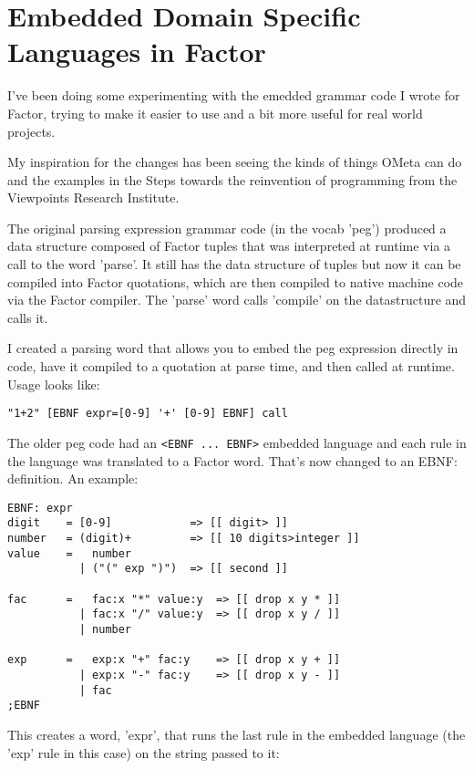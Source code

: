 \chapter{Embedded Domain Specific Languages in Factor}\label{pegsebnf}

I've been doing some experimenting with the emedded grammar code I
wrote for Factor, trying to make it easier to use and a bit more
useful for real world projects.

My inspiration for the changes has been seeing the kinds of things
OMeta can do and the examples in the Steps towards the reinvention of
programming from the Viewpoints Research Institute.

The original parsing expression grammar code (in the vocab 'peg')
produced a data structure composed of Factor tuples that was
interpreted at runtime via a call to the word 'parse'. It still has
the data structure of tuples but now it can be compiled into Factor
quotations, which are then compiled to native machine code via the
Factor compiler. The 'parse' word calls 'compile' on the datastructure
and calls it.

I created a parsing word that allows you to embed the peg expression
directly in code, have it compiled to a quotation at parse time, and
then called at runtime. Usage looks like:

\begin{verbatim}
"1+2" [EBNF expr=[0-9] '+' [0-9] EBNF] call
\end{verbatim}

The older peg code had an \texttt{<EBNF ... EBNF>} embedded language and each
rule in the language was translated to a Factor word. That's now
changed to an EBNF: definition. An example:

\begin{verbatim}
EBNF: expr 
digit    = [0-9]            => [[ digit> ]]
number   = (digit)+         => [[ 10 digits>integer ]]
value    =   number 
           | ("(" exp ")")  => [[ second ]]

fac      =   fac:x "*" value:y  => [[ drop x y * ]]
           | fac:x "/" value:y  => [[ drop x y / ]]
           | number

exp      =   exp:x "+" fac:y    => [[ drop x y + ]]
           | exp:x "-" fac:y    => [[ drop x y - ]]
           | fac
;EBNF
\end{verbatim}

This creates a word, 'expr', that runs the last rule in the embedded
language (the 'exp' rule in this case) on the string passed to it:

